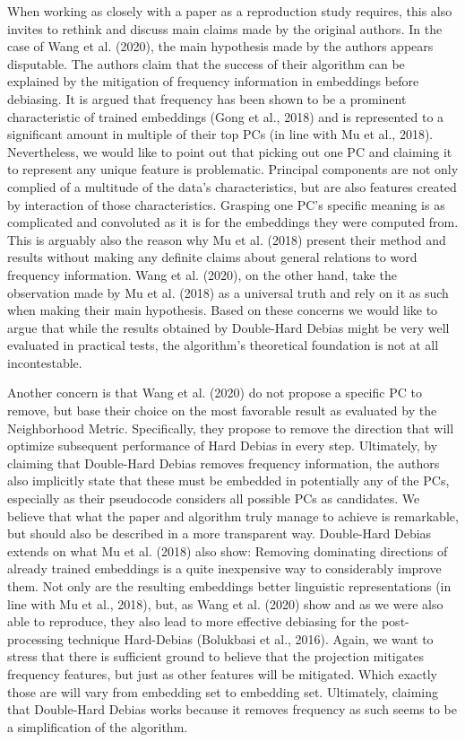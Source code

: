 \documentclass[
  english,
  man,floatsintext]{apa6}
\begin{document}
When working as closely with a paper as a reproduction study requires, this also invites to rethink and discuss main claims made by the original authors. In the case of Wang et al. (2020), the main hypothesis made by the authors appears disputable. The authors claim that the success of their algorithm can be explained by the mitigation of frequency information in embeddings before debiasing. It is argued that frequency has been shown to be a prominent characteristic of trained embeddings (Gong et al., 2018) and is represented to a significant amount in multiple of their top PCs (in line with Mu et al., 2018). Nevertheless, we would like to point out that picking out one PC and claiming it to represent any unique feature is problematic. Principal components are not only complied of a multitude of the data's characteristics, but are also features created by interaction of those characteristics. Grasping one PC's specific meaning is as complicated and convoluted as it is for the embeddings they were computed from. This is arguably also the reason why Mu et al. (2018) present their method and results without making any definite claims about general relations to word frequency information. Wang et al. (2020), on the other hand, take the observation made by Mu et al. (2018) as a universal truth and rely on it as such when making their main hypothesis. Based on these concerns we would like to argue that while the results obtained by Double-Hard Debias might be very well evaluated in practical tests, the algorithm's theoretical foundation is not at all incontestable.

Another concern is that Wang et al. (2020) do not propose a specific PC to remove, but base their choice on the most favorable result as evaluated by the Neighborhood Metric. Specifically, they propose to remove the direction that will optimize subsequent performance of Hard Debias in every step. Ultimately, by claiming that Double-Hard Debias removes frequency information, the authors also implicitly state that these must be embedded in potentially any of the PCs, especially as their pseudocode considers all possible PCs as candidates.
We believe that what the paper and algorithm truly manage to achieve is remarkable, but should also be described in a more transparent way. Double-Hard Debias extends on what Mu et al. (2018) also show: Removing dominating directions of already trained embeddings is a quite inexpensive way to considerably improve them. Not only are the resulting embeddings better linguistic representations (in line with Mu et al., 2018), but, as Wang et al. (2020) show and as we were also able to reproduce, they also lead to more effective debiasing for the post-processing technique Hard-Debias (Bolukbasi et al., 2016).
Again, we want to stress that there is sufficient ground to believe that the projection mitigates frequency features, but just as other features will be mitigated. Which exactly those are will vary from embedding set to embedding set. Ultimately, claiming that Double-Hard Debias works because it removes frequency as such seems to be a simplification of the algorithm.
\end{document}
